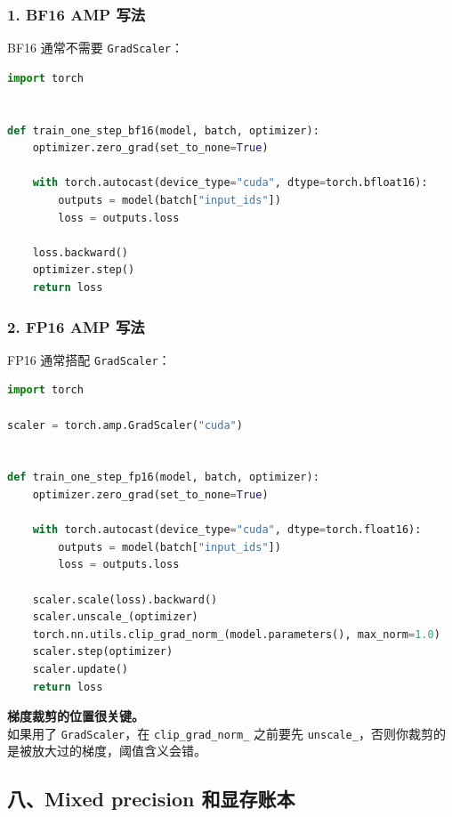 \subsubsection*{1. BF16 AMP 写法}

BF16 通常不需要 \texttt{GradScaler}：

\begin{lstlisting}[language=Python, caption=BF16 autocast 训练骨架]
import torch


def train_one_step_bf16(model, batch, optimizer):
    optimizer.zero_grad(set_to_none=True)

    with torch.autocast(device_type="cuda", dtype=torch.bfloat16):
        outputs = model(batch["input_ids"])
        loss = outputs.loss

    loss.backward()
    optimizer.step()
    return loss
\end{lstlisting}

\subsubsection*{2. FP16 AMP 写法}

FP16 通常搭配 \texttt{GradScaler}：

\begin{lstlisting}[language=Python, caption=FP16 autocast + GradScaler 训练骨架]
import torch

scaler = torch.amp.GradScaler("cuda")


def train_one_step_fp16(model, batch, optimizer):
    optimizer.zero_grad(set_to_none=True)

    with torch.autocast(device_type="cuda", dtype=torch.float16):
        outputs = model(batch["input_ids"])
        loss = outputs.loss

    scaler.scale(loss).backward()
    scaler.unscale_(optimizer)
    torch.nn.utils.clip_grad_norm_(model.parameters(), max_norm=1.0)
    scaler.step(optimizer)
    scaler.update()
    return loss
\end{lstlisting}

\begin{warnbox}
\textbf{梯度裁剪的位置很关键。}\\
如果用了 \texttt{GradScaler}，在 \texttt{clip\_grad\_norm\_} 之前要先 \texttt{unscale\_}，否则你裁剪的是被放大过的梯度，阈值含义会错。
\end{warnbox}

\subsection{八、Mixed precision 和显存账本}

